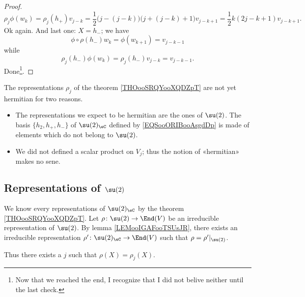 \begin{proof}
\begin{equation}
		\rho_j\phi(w_k)=\rho_j(h_+)v_{j-k}=\frac{ 1 }{2}\big( j-(j-k) \big)\big( j+(j-k)+1 \big)v_{j-k+1}=\frac{ 1 }{2}k(2j-k+1)v_{j-k+1}.
	\end{equation}
	Ok again. And last one: \( X=h_-\); we have
	\begin{equation}
		\phi\circ\rho(h_-)w_k=\phi(w_{k+1})=v_{j-k-1}
	\end{equation}
	while
	\begin{equation}
		\rho_j(h_-)\phi(w_k)=\rho_j(h_-)v_{j-k}=v_{j-k-1}.
	\end{equation}
	Done\footnote{Now that we reached the end, I recognize that I did not belive neither until the last check.}.
\end{proof}

\begin{normaltext}
	The representations \( \rho_j\) of the theorem \ref{THOooSRQYooXQDZpT} are not yet hermitian for two reasons.
	\begin{itemize}
		\item The representations we expect to be hermitian are the ones of \( \su(2)\). The basis \( \{ h_2,h_{+}, h_{-} \}\) of \( \su(2)_{\eC}\) defined by \eqref{EQSooORIBooAsgdDp} is made of elements which do not belong to \( \su(2)\).
		\item We did not defined a scalar product on \( V_j\); thus the notion of «hermitian» makes no sene.
	\end{itemize}
\end{normaltext}

\subsection{Representations of \texorpdfstring{$ \su(2)$}{su(2)}}

We know every representations of \( \su(2)_{\eC}\) by the theorem \ref{THOooSRQYooXQDZpT}. Let \( \rho\colon \su(2)\to \End(V)\) be an irreducible representation of \( \su(2)\). By lemma \ref{LEMooIGAFooTSUsJR}, there exists an irreducible representation \( \rho'\colon \su(2)_{\eC}\to \End(V)\) such that \( \rho=\rho'|_{\su(2)}\).

Thus there exists a \( j\) such that \( \rho(X)=\rho_j(X)\).

